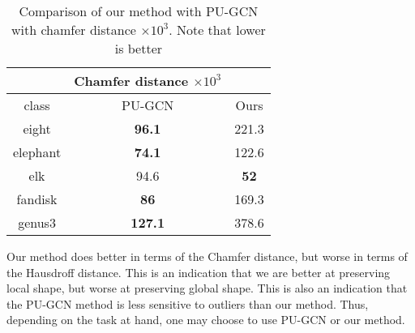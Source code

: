 \begin{table}[H]
\centering
\begin{tabular}{ccc}
	& Chamfer distance $\times 10^3$ &\\
	\hline
	class & PU-GCN & Ours \\
	\hline
	eight & \textbf{96.1} & {221.3} \\ 
	elephant &  \textbf{74.1}& {122.6} \\
	elk & {94.6} & \textbf{52} \\  
	fandisk & \textbf{86} & {169.3} \\  
	genus3 & \textbf{127.1} & {378.6}  \\
\end{tabular}
\caption{Comparison of our method with PU-GCN with chamfer distance $\times 10^3$. Note that lower is better}
\end{table}

Our method does better in terms of the Chamfer distance, but worse in terms of the Hausdroff distance.
This is an indication that we are better at preserving local shape, but worse at preserving global shape.
This is also an indication that the PU-GCN method is less sensitive to outliers than our method.
Thus, depending on the task at hand, one may choose to use PU-GCN or our method.


